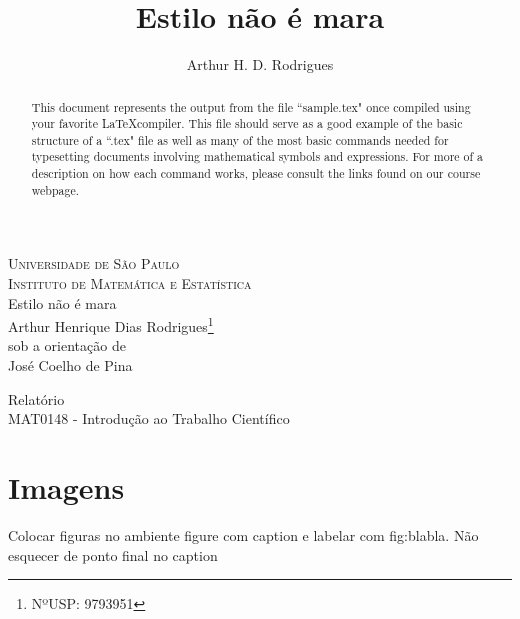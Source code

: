 \documentclass[]{article}
\begin{document}
\begin{titlepage}
	\begin{center}{\scshape
		Universidade de São Paulo \\
		Instituto de Matemática e Estatística}\\
		\vspace{5cm}
		{\huge
			Estilo não é mara
		}\\
		\vspace{.5cm}
		{\large Arthur Henrique Dias Rodrigues}\footnote{NºUSP: 9793951}\\
		{\footnotesize sob a orientação de}\\
		{\large José Coelho de Pina}
	\end{center}
	\vspace{3cm}
	\vfill
	\begin{center}
		Relatório \\
		MAT0148 - Introdução ao Trabalho Científico
	\end{center}

\end{titlepage}
\newpage


\title{Estilo não é mara}
\author{Arthur H. D. Rodrigues}
\maketitle
\tableofcontents
\newpage
\begin{abstract}
This document represents the output from the file ``sample.tex" once compiled using your favorite \LaTeX compiler.  This file should serve as a good example of the basic structure of a ``.tex" file as well as many of the most basic commands needed for typesetting documents involving mathematical symbols and expressions.  For more of a description on how each command works, please consult the links found on our course webpage.

\end{abstract}


\section{Imagens}
Colocar figuras no ambiente figure com caption e labelar com fig:blabla.
Não esquecer de ponto final no caption
\end{document}
